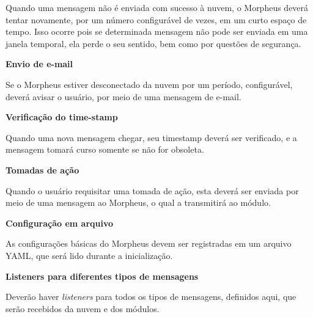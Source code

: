 \begin{description}
Quando uma mensagem não é enviada com sucesso à nuvem, o Morpheus deverá tentar novamente, por um número configurável de vezes, em um
curto espaço de tempo. Isso ocorre pois se determinada mensagem não pode ser enviada em uma janela temporal, ela perde o seu sentido, bem como por questões de segurança.

\item \textbf{Envio de e-mail}

Se o Morpheus estiver desconectado da nuvem por um período, configurável, deverá avisar o usuário, por meio de uma mensagem de e-mail.

\item \textbf{Verificação do time-stamp}

Quando uma nova mensagem chegar, seu timestamp deverá ser verificado, e a mensagem tomará curso somente se não for obsoleta.

\item \textbf{Tomadas de ação}

Quando o usuário requisitar uma tomada de ação, esta deverá ser enviada por meio de uma mensagem ao Morpheus, o qual a transmitirá ao módulo.

\item \textbf{Configuração em arquivo}

As configurações básicas do Morpheus devem ser registradas em um arquivo YAML, que será lido durante a inicialização.

\item \textbf{Listeners para diferentes tipos de mensagens}

Deverão haver \textit{listeners} para todos os tipos de mensagens, definidos aqui, que serão recebidos da nuvem e dos módulos.

\end{description}

